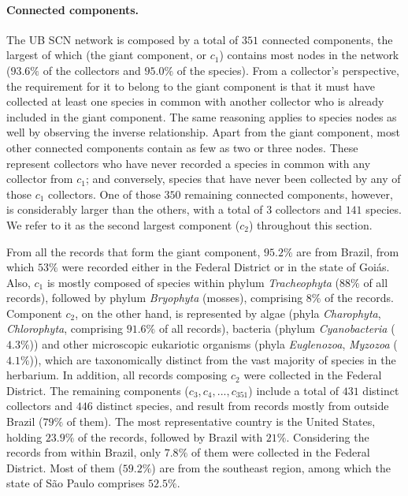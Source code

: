 \paragraph*{Connected components.}
The UB SCN network is composed by a total of $351$ connected components, the largest of which (the giant component, or $c_1$) contains most nodes in the network ($93.6\%$ of the collectors and $95.0\%$ of the species). 
From a collector's perspective, the requirement for it to belong to the giant component is that it must have collected at least one species in common with another collector who is already included in the giant component. The same reasoning applies to species nodes as well by observing the inverse relationship.
Apart from the giant component, most other connected components contain as few as two or three nodes. These represent collectors who have never recorded a species in common with any collector from $c_1$; and conversely, species that have never been collected by any of those $c_1$ collectors.
One of those $350$ remaining connected components, however, is considerably larger than the others, with a total of $3$ collectors and $141$ species. We refer to it as the second largest component ($c_2$) throughout this section.

From all the records that form the giant component, $95.2\%$ are from Brazil, from which $53\%$ were recorded either in the Federal District or in the state of Goiás. 
Also, $c_1$ is mostly composed of species within phylum \textit{Tracheophyta} ($88\%$ of all records), followed by phylum \textit{Bryophyta} (mosses), comprising $8\%$ of the records. 
Component $c_2$, on the other hand, is represented by algae (phyla \textit{Charophyta}, \textit{Chlorophyta}, comprising $91.6\%$ of all records), bacteria (phylum \textit{Cyanobacteria} ($4.3\%$)) and other microscopic eukariotic organisms (phyla \textit{Euglenozoa}, \textit{Myzozoa} ($4.1\%$)), which are taxonomically distinct from the vast majority of species in the herbarium.
In addition, all records composing $c_2$ were collected in the Federal District.
The remaining components ($c_3,c_4,..., c_{351}$) include a total of $431$ distinct collectors and $446$ distinct species, and result from records mostly from outside Brazil ($79\%$ of them).
The most representative country is the United States, holding $23.9\%$ of the records, followed by Brazil with $21\%$. 
Considering the records from within Brazil, only $7.8\%$ of them were collected in the Federal District. Most of them ($59.2\%$) are from the southeast region, among which the state of São Paulo comprises $52.5\%$.

